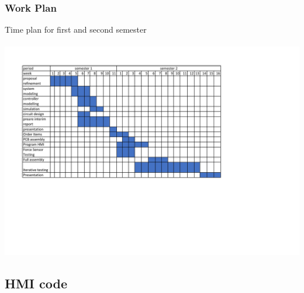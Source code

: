  \subsubsection{Work Plan}
 \begin{center}
 \begin{table}[!h]
 \centering
 \caption[Time plan]{Time plan for first and second semester}
 \paragraph{ }
 \includegraphics[width=0.95\linewidth]{Figures/workplan}
 \end{table}
 \end{center}
\subsection{HMI code}
